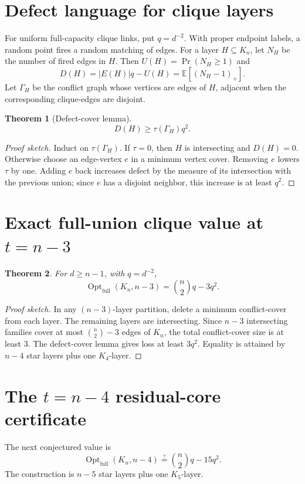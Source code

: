 \documentclass[11pt]{article}
\newtheorem{theorem}{Theorem}
\begin{document}
\section{Defect language for clique layers}
For uniform full-capacity clique links, put $q=d^{-2}$. With proper endpoint labels, a random point fires a random matching of edges. For a layer $H\subseteq K_n$, let $N_H$ be the number of fired edges in $H$. Then $U(H)=\Pr(N_H\ge1)$ and
\[
D(H)=|E(H)|q-U(H)=\mathbb E[(N_H-1)_+].
\]
Let $\Gamma_H$ be the conflict graph whose vertices are edges of $H$, adjacent when the corresponding clique-edges are disjoint.
\begin{theorem}[Defect-cover lemma]
\[
D(H)\ge \tau(\Gamma_H)q^2.
\]
\end{theorem}
\begin{proof}[Proof sketch]
Induct on $\tau(\Gamma_H)$. If $\tau=0$, then $H$ is intersecting and $D(H)=0$. Otherwise choose an edge-vertex $e$ in a minimum vertex cover. Removing $e$ lowers $\tau$ by one. Adding $e$ back increases defect by the measure of its intersection with the previous union; since $e$ has a disjoint neighbor, this increase is at least $q^2$.
\end{proof}

\section{Exact full-union clique value at $t=n-3$}
\begin{theorem}
For $d\ge n-1$, with $q=d^{-2}$,
\[
\operatorname{Opt}_{\mathrm{full}}(K_n,n-3)=\binom n2q-3q^2.
\]
\end{theorem}
\begin{proof}[Proof sketch]
In any $(n-3)$-layer partition, delete a minimum conflict-cover from each layer. The remaining layers are intersecting. Since $n-3$ intersecting families cover at most $\binom n2-3$ edges of $K_n$, the total conflict-cover size is at least $3$. The defect-cover lemma gives loss at least $3q^2$. Equality is attained by $n-4$ star layers plus one $K_4$-layer.
\end{proof}

\section{The $t=n-4$ residual-core certificate}
The next conjectured value is
\[
\operatorname{Opt}_{\mathrm{full}}(K_n,n-4)\stackrel{?}{=}\binom n2q-15q^2.
\]
The construction is $n-5$ star layers plus one $K_5$-layer.
\end{document}
